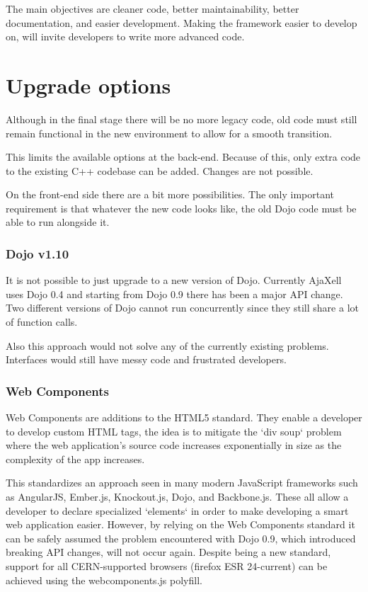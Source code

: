 \documentclass[journal,compsoc,a4paper]{IEEEtran}
\begin{document}
The main objectives are cleaner code, better maintainability, better documentation,
and easier development. Making the framework easier to develop on, will invite
developers to write more advanced code.

\section{Upgrade options}
Although in the final stage there will be no more legacy code, old code
must still remain functional in the new environment to allow for a smooth
transition.

This limits the available options at the back-end. Because of this, only extra
code to the existing C++ codebase can be added. Changes are not possible.

On the front-end side there are a bit more possibilities.
The only important requirement is that whatever the new code looks like, the old
Dojo code must be able to run alongside it.
\subsubsection{Dojo v1.10}
It is not possible to just upgrade to a new version of Dojo. Currently AjaXell
uses Dojo 0.4 and starting from Dojo 0.9 there has been a major API change.
Two different versions of Dojo cannot run concurrently since they still share
a lot of function calls.

Also this approach would not solve any of the currently existing problems.
Interfaces would still have messy code and frustrated developers.
\subsubsection{Web Components}
Web Components\cite{WebComponentsW3C}\cite{WebcomponentsMozilla} are additions to the HTML5 standard. They
enable a developer to develop custom HTML tags, the idea is to mitigate the
`div soup` problem\cite{DivSoup} where the web application's source code increases
exponentially in size as the complexity of the app increases.

This standardizes an approach seen in many modern JavaScript frameworks such as
AngularJS, Ember.js, Knockout.js, Dojo, and Backbone.js. These all allow a developer to
declare specialized `elements` in order to make developing a smart web application
easier.
However, by relying on the Web Components standard it can be safely assumed the
problem encountered with Dojo 0.9, which introduced breaking API changes, will
not occur again.
Despite being a new standard, support for all CERN-supported
browsers (firefox ESR 24-current) can be achieved using the webcomponents.js polyfill.
\end{document}
